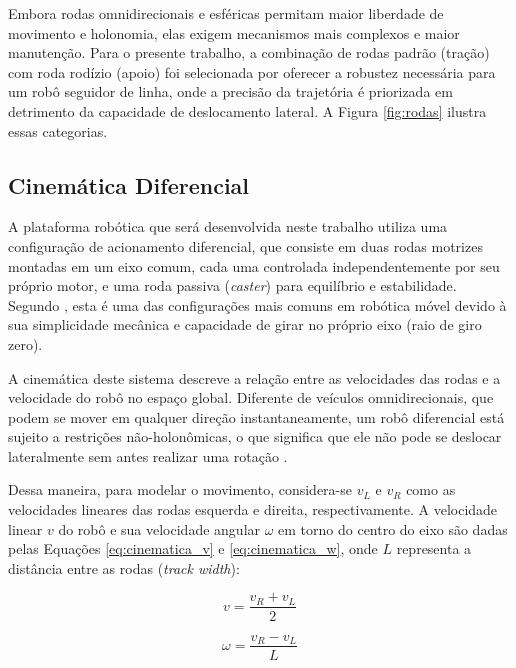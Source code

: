 Embora rodas omnidirecionais e esféricas permitam maior liberdade de movimento e holonomia, elas exigem mecanismos mais complexos e maior manutenção. Para o presente trabalho, a combinação de rodas padrão (tração) com roda rodízio (apoio) foi selecionada por oferecer a robustez necessária para um robô seguidor de linha, onde a precisão da trajetória é priorizada em detrimento da capacidade de deslocamento lateral. A Figura \ref{fig:rodas} ilustra essas categorias.

\subsection{Cinemática Diferencial}
\label{subsec:cinematica_diferencial}

A plataforma robótica que será desenvolvida neste trabalho utiliza uma configuração de acionamento diferencial, que consiste em duas rodas motrizes montadas em um eixo comum, cada uma controlada independentemente por seu próprio motor, e uma roda passiva (\textit{caster}) para equilíbrio e estabilidade. Segundo , esta é uma das configurações mais comuns em robótica móvel devido à sua simplicidade mecânica e capacidade de girar no próprio eixo (raio de giro zero).

A cinemática deste sistema descreve a relação entre as velocidades das rodas e a velocidade do robô no espaço global. Diferente de veículos omnidirecionais, que podem se mover em qualquer direção instantaneamente, um robô diferencial está sujeito a restrições não-holonômicas, o que significa que ele não pode se deslocar lateralmente sem antes realizar uma rotação \cite{lynch2017modern}.

Dessa maneira, para modelar o movimento, considera-se $v_L$ e $v_R$ como as velocidades lineares das rodas esquerda e direita, respectivamente. A velocidade linear $v$ do robô e sua velocidade angular $\omega$ em torno do centro do eixo são dadas pelas Equações \ref{eq:cinematica_v} e \ref{eq:cinematica_w}, onde $L$ representa a distância entre as rodas (\textit{track width}):

\begin{equation}
    v = \frac{v_R + v_L}{2}
    \label{eq:cinematica_v}
\end{equation}

\begin{equation}
    \omega = \frac{v_R - v_L}{L}
    \label{eq:cinematica_w}
\end{equation}

